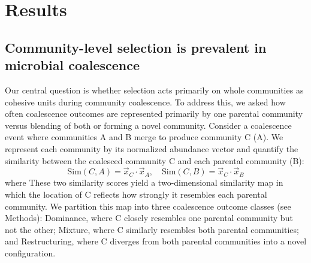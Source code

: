 \section{Results}
\label{sec:results}



\subsection{Community-level selection is prevalent in microbial coalescence}
\label{sec:results:dominance_prevalent}

Our central question is whether selection acts primarily on whole communities as cohesive units during community coalescence. To address this, we asked how often coalescence outcomes are represented primarily by one parental community versus blending of both or forming a novel community. Consider a coalescence event where communities A and B merge to produce community C (A). We represent each community by its normalized abundance vector and quantify the similarity between the coalesced community C and each parental community (B):
\begin{equation}
\text{Sim}(C, A) = \vec{x}_C \cdot \vec{x}_A, \quad \text{Sim}(C, B) = \vec{x}_C \cdot \vec{x}_B
\label{eq:similarity}
\end{equation}
where  These two similarity scores yield a two-dimensional similarity map in which the location of C reflects how strongly it resembles each parental community. We partition this map into three coalescence outcome classes (see Methods): Dominance, where C closely resembles one parental community but not the other; Mixture, where C similarly resembles both parental communities; and Restructuring, where C diverges from both parental communities into a novel configuration.  


